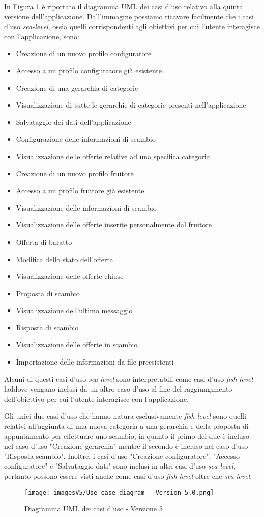 In Figura \ref{fig:Use Case 5} è riportato il diagramma UML dei casi d'uso relativo alla quinta versione dell'applicazione. Dall'immagine possiamo ricavare facilmente che i casi d'uso \textit{sea-level}, ossia quelli corrispondenti agli obiettivi per cui l'utente interagisce con l'applicazione, sono:
\begin{itemize}
    \item Creazione di un nuovo profilo configuratore 
    \item Accesso a un profilo configuratore già esistente
    \item Creazione di una gerarchia di categorie
    \item Visualizzazione di tutte le gerarchie di categorie presenti nell'applicazione
    \item Salvataggio dei dati dell'applicazione
    \item Configurazione delle informazioni di scambio
    \item Visualizzazione delle offerte relative ad una specifica categoria
    \item Creazione di un nuovo profilo fruitore
    \item Accesso a un profilo fruitore già esistente
    \item Visualizzazione delle informazioni di scambio
    \item Visualizzazione delle offerte inserite personalmente dal fruitore
    \item Offerta di baratto
    \item Modifica dello stato dell'offerta  
    \item Visualizzazione delle offerte chiuse
    \item Proposta di scambio
    \item Visualizzazione dell'ultimo messaggio
    \item Risposta di scambio
    \item Visualizzazione delle offerte in scambio
    \item Importazione delle informazioni da file preesistenti
\end{itemize}
Alcuni di questi casi d'uso \textit{sea-level} sono interpretabili come casi d'uso \textit{fish-level} laddove vengano inclusi da un altro caso d'uso al fine del raggiungimento dell'obiettivo per cui l'utente interagisce con l'applicazione.

Gli unici due casi d'uso che hanno natura esclusivamente \textit{fish-level} sono quelli relativi all'aggiunta di una nuova categoria a una gerarchia e della proposta di appuntamento per effettuare uno scambio, in quanto il primo dei due è incluso nel caso d'uso "Creazione gerarchia" mentre il secondo è incluso nel caso d'uso "Risposta scambio". Inoltre, i casi d'uso "Creazione configuratore", "Accesso configuratore" e "Salvataggio dati" sono inclusi in altri casi d'uso \textit{sea-level}, pertanto possono essere visti anche come casi d'uso \textit{fish-level} oltre che \textit{sea-level}.

\begin{figure}[ht]
\centering
\texttt{[image: imagesV5/Use case diagram - Version 5.0.png]}
\caption{\label{fig:Use Case 5}Diagramma UML dei casi d'uso - Versione 5}
\end{figure}\bigskip

